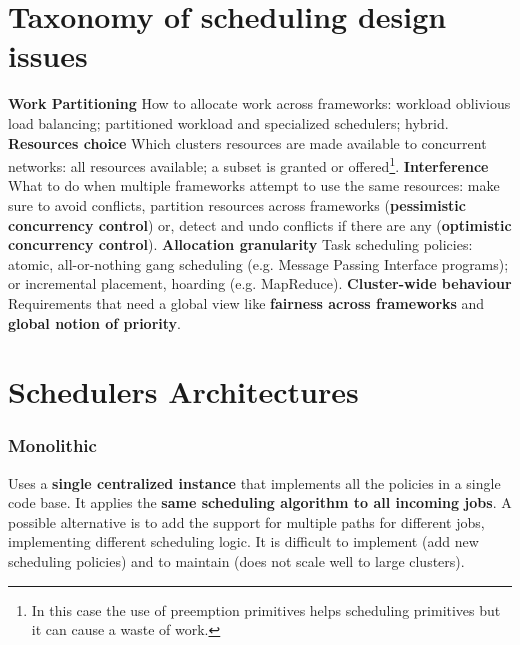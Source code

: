 \section{Taxonomy of scheduling design issues}
	\textbf{Work Partitioning}\newline
	How to allocate work across frameworks: workload oblivious load balancing; partitioned workload and specialized schedulers; hybrid.\newline
	\newline
	\textbf{Resources choice}\newline
	Which clusters resources are made available to concurrent networks: all resources available; a subset is granted or offered\footnote{In this case the use of preemption primitives helps scheduling primitives but it can cause a waste of work.}.\newline
	\newline
	\textbf{Interference}\newline
	What to do when multiple frameworks attempt to use the same resources: make sure to avoid conflicts, partition resources across frameworks (\textbf{pessimistic concurrency control}) or, detect and undo conflicts if there are any (\textbf{optimistic concurrency control}).\newline
	\newline
	\textbf{Allocation granularity}\newline
	Task scheduling policies: atomic, all-or-nothing gang scheduling (e.g. Message Passing Interface programs); or incremental placement, hoarding (e.g. MapReduce).\newline
	\newline
	\textbf{Cluster-wide behaviour}\newline
	Requirements that need a global view like \textbf{fairness across frameworks} and \textbf{global notion of priority}.

\section{Schedulers Architectures}
	\subsubsection{Monolithic}
	Uses a \textbf{single centralized instance} that implements all the policies in a single code base. It applies the \textbf{same scheduling algorithm to all incoming jobs}.\newline
	A possible alternative is to add the support for multiple paths for different jobs, implementing different scheduling logic.\newline
	It is difficult to implement (add new scheduling policies) and to maintain (does not scale well to large clusters).
